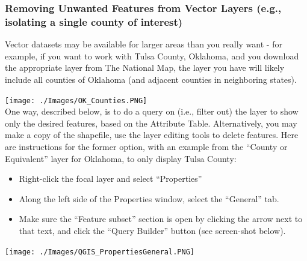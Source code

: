 \documentclass[12pt,]{article}
\begin{document}
\subsubsection{Removing Unwanted Features from Vector Layers (e.g.,
isolating a single county of
interest)}\label{removing-unwanted-features-from-vector-layers-e.g.-isolating-a-single-county-of-interest}

Vector datasets may be available for larger areas than you really want -
for example, if you want to work with Tulsa County, Oklahoma, and you
download the appropriate layer from The National Map, the layer you have
will likely include all counties of Oklahoma (and adjacent counties in
neighboring states).

\texttt{[image: ./Images/OK\_Counties.PNG]}\\

One way, described below, is to do a query on (i.e., filter out) the
layer to show only the desired features, based on the Attribute Table.
Alternatively, you may make a copy of the shapefile, use the layer
editing tools to delete features. Here are instructions for the former
option, with an example from the ``County or Equivalent'' layer for
Oklahoma, to only display Tulsa County:

\begin{itemize}
\itemsep1pt\parskip0pt
\item
  Right-click the focal layer and select ``Properties''
\item
  Along the left side of the Properties window, select the ``General''
  tab.
\item
  Make sure the ``Feature subset'' section is open by clicking the arrow
  next to that text, and click the ``Query Builder'' button (see
  screen-shot below).
\end{itemize}

\texttt{[image: ./Images/QGIS\_PropertiesGeneral.PNG]}\\
\end{document}
